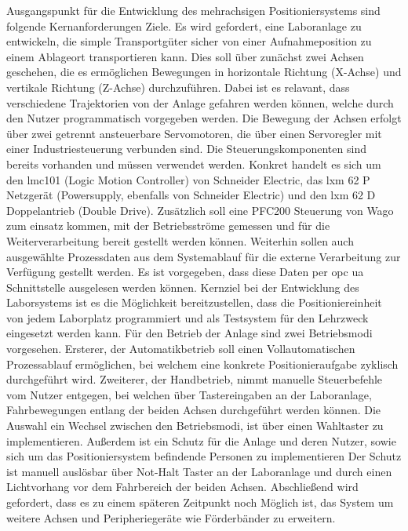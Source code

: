 \documentclass[../../../Bachelorarbeit.tex]{subfiles}
\begin{document}
Ausgangspunkt für die Entwicklung des mehrachsigen Positioniersystems sind folgende Kernanforderungen \bzw Ziele. Es wird gefordert, eine Laboranlage zu entwickeln, die simple Transportgüter sicher von einer Aufnahmeposition zu einem Ablageort transportieren kann. Dies soll über zunächst zwei Achsen geschehen, die es ermöglichen Bewegungen in horizontale Richtung (X-Achse) und vertikale Richtung (Z-Achse) durchzuführen. Dabei ist es relavant, dass verschiedene Trajektorien von der Anlage gefahren werden können, welche durch den Nutzer programmatisch vorgegeben werden. Die Bewegung der Achsen erfolgt über zwei getrennt ansteuerbare Servomotoren, die über einen Servoregler mit einer Industriesteuerung verbunden sind. Die Steuerungskomponenten sind bereits vorhanden und müssen verwendet werden. Konkret handelt es sich um den \acs{lmc}101 (Logic Motion Controller) von Schneider Electric, das \acs{lxm} 62 P Netzgerät (\eng Powersupply, ebenfalls von Schneider Electric) und den \acs{lxm} 62 D Doppelantrieb (\eng Double Drive). Zusätzlich soll eine PFC200 Steuerung von Wago zum einsatz kommen, mit der Betriebsströme gemessen und für die Weiterverarbeitung bereit gestellt werden können. Weiterhin sollen auch ausgewählte Prozessdaten aus dem Systemablauf für die externe Verarbeitung zur Verfügung gestellt werden. Es ist vorgegeben, dass diese Daten per \ac{opc} \ac{ua} Schnittstelle ausgelesen werden können. Kernziel bei der Entwicklung des Laborsystems ist es die Möglichkeit bereitzustellen, dass die Positioniereinheit von jedem Laborplatz programmiert und als Testsystem für den Lehrzweck eingesetzt werden kann. Für den Betrieb der Anlage sind zwei Betriebsmodi vorgesehen. Ersterer, der Automatikbetrieb soll einen Vollautomatischen Prozessablauf ermöglichen, bei welchem eine konkrete Positionieraufgabe zyklisch durchgeführt wird. Zweiterer, der Handbetrieb, nimmt manuelle Steuerbefehle vom Nutzer entgegen, bei welchen über Tastereingaben an der Laboranlage, Fahrbewegungen entlang der beiden Achsen durchgeführt werden können. Die Auswahl \bzw ein Wechsel zwischen den Betriebsmodi, ist über einen Wahltaster zu implementieren. Außerdem ist ein Schutz für die Anlage und deren Nutzer, sowie sich um das Positioniersystem befindende Personen zu implementieren Der Schutz ist manuell auslösbar über Not-Halt Taster an der Laboranlage und durch einen Lichtvorhang vor dem Fahrbereich der beiden Achsen. Abschließend wird gefordert, dass es zu einem späteren Zeitpunkt noch Möglich ist, das System um weitere Achsen und Peripheriegeräte wie \bspw Förderbänder zu erweitern. %
\end{document}
